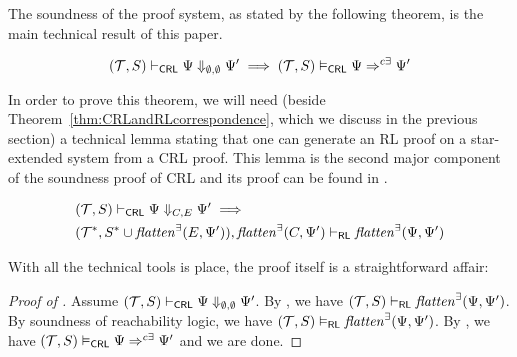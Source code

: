 The soundness of the proof system, as stated by the following theorem, is the main
technical result of this paper.

\begin{theorem}\label{thm:proofsystemSoundness}
\begin{equation*}
    (\mathcal{T}, S) \vdash_{\mathsf{CRL}} \Psi \Downarrow_{\emptyset,\emptyset} \Psi^\prime \implies
    (\mathcal{T}, S) \vDash_{\mathsf{CRL}} \Psi \Rightarrow^{c\exists} \Psi^\prime
\end{equation*}
\end{theorem}

In order to  prove this theorem, we will need (beside
Theorem~\ref{thm:CRLandRLcorrespondence}, which we discuss in the previous
section) a technical lemma stating that one can generate an RL proof on a star-extended system
from a CRL proof. This lemma is the second major component of the soundness
proof of CRL and its proof can be found in .
\begin{lemma}\label{lem:CRLalmostSoundness}
    \begin{align*}
        & (\mathcal{T}, S) \vdash_{\mathsf{CRL}} \Psi \Downarrow_{C,E} \Psi^\prime \implies \\
        &
        (\mathcal{T}^*, S^* \cup \mathit{flatten}^\exists(E, \Psi^\prime)), \mathit{flatten}^\exists(C, \Psi^\prime) \vdash_{\mathsf{RL}}
          \mathit{flatten}^\exists(\Psi, \Psi^\prime) 
    \end{align*}
\end{lemma}

\noindent With all the technical tools is place, the proof itself is a straightforward affair:
\begin{proof}[Proof of ]
Assume $(\mathcal{T}, S) \vdash_{\mathsf{CRL}} \Psi \Downarrow_{\emptyset,\emptyset} \Psi^\prime$.
By , we have $(\mathcal{T}, S) \vdash_{\mathsf{RL}} \mathit{flatten}^\exists(\Psi, \Psi^\prime)$.
By soundness of reachability logic, we have $(\mathcal{T}, S) \vDash_{\mathsf{RL}} \mathit{flatten}^\exists(\Psi, \Psi^\prime)$.
By , 
we have $(\mathcal{T}, S) \vDash_{\mathsf{CRL}} \Psi \Rightarrow^{c\exists} \Psi^\prime$ and we are done.
\end{proof}


